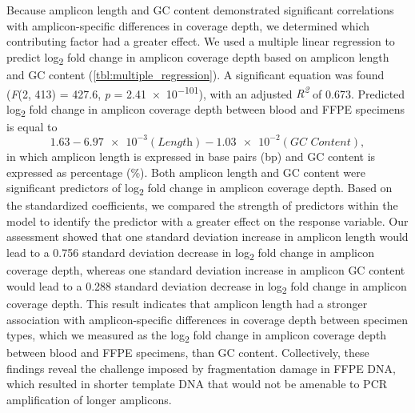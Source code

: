 Because amplicon length and GC content demonstrated significant correlations with amplicon-specific differences in coverage depth, we determined which contributing factor had a greater effect. We used a multiple linear regression to predict log\textsubscript{2} fold change in amplicon coverage depth based on amplicon length and GC content (\autoref{tbl:multiple_regression}). A significant equation was found (\textit{F}(2, 413) = 427.6, \textit{p} = \num{2.41e-101}), with an adjusted \textit{R\textsuperscript{2}} of 0.673. Predicted log\textsubscript{2} fold change in amplicon coverage depth between blood and FFPE specimens is equal to $$1.63 - \num{6.97e-3}(\textit{Length}) - \num{1.03e-2}(\textit{GC Content}),$$ in which amplicon length is expressed in base pairs (bp) and GC content is expressed as percentage (\%). Both amplicon length and GC content were significant predictors of log\textsubscript{2} fold change in amplicon coverage depth. Based on the standardized coefficients, we compared the strength of predictors within the model to identify the predictor with a greater effect on the response variable. Our assessment showed that one standard deviation increase in amplicon length would lead to a 0.756 standard deviation decrease in log\textsubscript{2} fold change in amplicon coverage depth, whereas one standard deviation increase in amplicon GC content would lead to a 0.288 standard deviation decrease in log\textsubscript{2} fold change in amplicon coverage depth. This result indicates that amplicon length had a stronger association with amplicon-specific differences in coverage depth between specimen types, which we measured as the log\textsubscript{2} fold change in amplicon coverage depth between blood and FFPE specimens, than GC content. Collectively, these findings reveal the challenge imposed by fragmentation damage in FFPE DNA, which resulted in shorter template DNA that would not be amenable to PCR amplification of longer amplicons.


